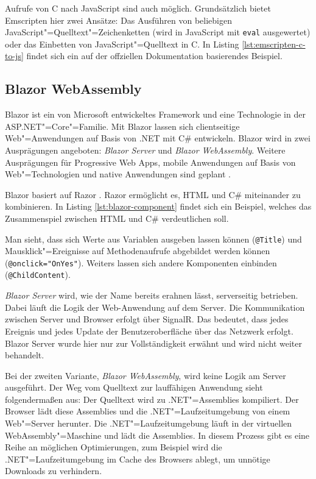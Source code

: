 Aufrufe von C nach JavaScript sind auch möglich. Grundsätzlich bietet Emscripten hier zwei Ansätze: Das Ausführen von beliebigen JavaScript"=Quelltext"=Zeichenketten (wird in JavaScript mit \lstinline{eval} ausgewertet) oder das Einbetten von JavaScript"=Quelltext in C. In Listing \ref{lst:emscripten-c-to-js} findet sich ein auf der offziellen Dokumentation basierendes Beispiel.



\subsection{Blazor WebAssembly}
Blazor \cite{Blazor} ist ein von Microsoft entwickeltes Framework und eine Technologie in der ASP.NET"=Core"=Familie. Mit Blazor lassen sich clientseitige Web"=Anwendungen auf Basis von .NET mit C\#{} entwickeln. Blazor wird in zwei Ausprägungen angeboten: \emph{Blazor Server} und \emph{Blazor WebAssembly}. Weitere Ausprägungen für Progressive Web Apps, mobile Anwendungen auf Basis von Web"=Technologien und native Anwendungen sind geplant \cite{BlazorBlog}.

Blazor basiert auf Razor \cite{Razor}. Razor ermöglicht es, HTML und C\#{} miteinander zu kombinieren. In Listing \ref{lst:blazor-component} findet sich ein Beispiel, welches das Zusammenspiel zwischen HTML und C\#{} verdeutlichen soll.

\pagebreak


Man sieht, dass sich Werte aus Variablen ausgeben lassen können (\lstinline{@Title}) und Mausklick"=Ereignisse auf Methodenaufrufe abgebildet werden können (\lstinline{@onclick="OnYes"}). Weiters lassen sich andere Komponenten einbinden (\lstinline{@ChildContent}).

\emph{Blazor Server} wird, wie der Name bereits erahnen lässt, serverseitig betrieben. Dabei läuft die Logik der Web-Anwendung auf dem Server. Die Kommunikation zwischen Server und Browser erfolgt über SignalR. Das bedeutet, dass jedes Ereignis und jedes Update der Benutzeroberfläche über das Netzwerk erfolgt. Blazor Server wurde hier nur zur Vollständigkeit erwähnt und wird nicht weiter behandelt.

Bei der zweiten Variante, \emph{Blazor WebAssembly}, wird keine Logik am Server ausgeführt. Der Weg vom Quelltext zur lauffähigen Anwendung sieht folgendermaßen aus: Der Quelltext wird zu .NET"=Assemblies kompiliert. Der Browser lädt diese Assemblies und die .NET"=Laufzeitumgebung von einem Web"=Server herunter. Die .NET"=Laufzeitumgebung läuft in der virtuellen WebAssembly"=Maschine und lädt die Assemblies. In diesem Prozess gibt es eine Reihe an möglichen Optimierungen, zum Beispiel wird die .NET"=Laufzeitumgebung im Cache des Browsers ablegt, um unnötige Downloads zu verhindern.

